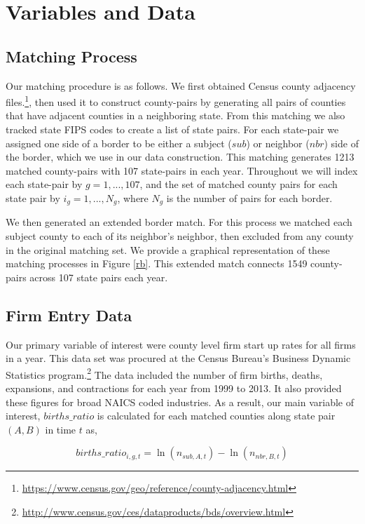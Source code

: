 \section{Variables and Data}

\subsection{Matching Process}

Our matching procedure is as follows. We first obtained Census county adjacency files.\footnote{\url{https://www.census.gov/geo/reference/county-adjacency.html}}, then used it to construct county-pairs by generating all pairs of counties that have adjacent counties in a neighboring state. From this matching we also tracked state FIPS codes to create a list of state pairs. For each state-pair we assigned one side of a border to be either a subject ($sub$) or neighbor ($nbr$) side of the border, which we use in our data construction. This matching generates 1213 matched county-pairs with 107 state-pairs in each year. Throughout we will index each state-pair by $g = 1,...,107$, and the set of matched county pairs for each state pair by $i_{g} = 1,...,N_{g}$, where $N_{g}$ is the number of pairs for each border.

We then generated an extended border match. For this process we matched each subject county to each of its neighbor's neighbor, then excluded from any county in the original matching set. We provide a graphical representation of these matching processes in Figure \ref{rb}. This extended match connects 1549 county-pairs across 107 state pairs each year.

\subsection{Firm Entry Data}

Our primary variable of interest were county level firm start up rates for all firms in a year. This data set was procured at the Census Bureau's Business Dynamic Statistics program.\footnote{\url{http://www.census.gov/ces/dataproducts/bds/overview.html}} The data included the number of firm births, deaths, expansions, and contractions for each year from 1999 to 2013. It also provided these figures for  broad NAICS coded industries. As a result, our main variable of interest, $births\_ratio$ is calculated for each matched counties along state pair $(A,B)$ in time $t$ as,

\begin{equation} births\_ratio_{i,g,t} = \ln(n_{sub,A,t})-\ln(n_{nbr,B,t})\end{equation}

